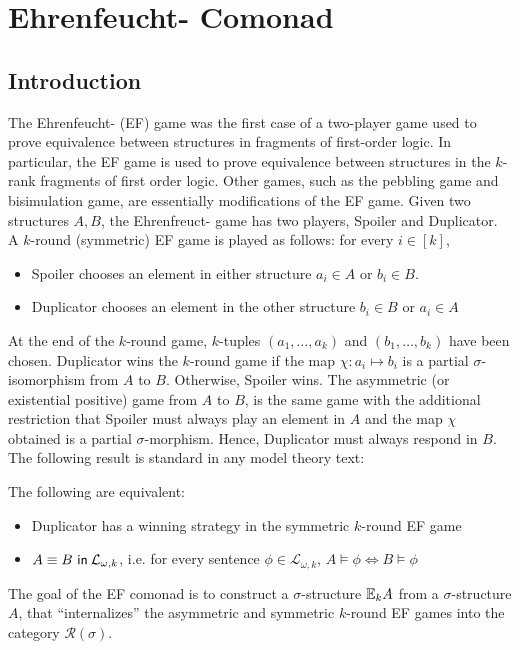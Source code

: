 \chapter{Ehrenfeucht-{\Fraisse} Comonad}
\section{Introduction}
The Ehrenfeucht-{\Fraisse} (EF) game was the first case of a two-player game used to prove equivalence between structures in fragments of first-order logic. In particular, the EF game is used to prove equivalence between structures in the $k$-rank fragments of first order logic. Other games, such as the pebbling game and bisimulation game, are essentially modifications of the EF game. Given two structures $A,B$, the Ehrenfreuct-{\Fraisse} game has two players, Spoiler and Duplicator. A $k$-round (symmetric) EF game is played as follows: for every $i \in [k]$, 
\begin{itemize}
\item Spoiler chooses an element in either structure $a_{i} \in A$ or $b_{i} \in B$. 
\item Duplicator chooses an element in the other structure $b_{i} \in B$ or $a_{i} \in A$  
\end{itemize}
At the end of the $k$-round game, $k$-tuples $(a_{1},\dots,a_{k})$ and $(b_{1},\dots,b_{k})$ have been chosen. Duplicator wins the $k$-round game if the map $\chi:a_{i} \longmapsto b_{i}$ is a partial $\sigma$-isomorphism from $A$ to $B$. Otherwise, Spoiler wins. The asymmetric (or existential positive) game from $A$ to $B$, is the same game with the additional restriction that Spoiler must always play an element in $A$ and the map $\chi$ obtained is a partial $\sigma$-morphism. Hence, Duplicator must always respond in $B$. The following result is standard in any model theory text:
\begin{prop}
The following are equivalent:
\begin{itemize}
\item Duplicator has a winning strategy in the symmetric $k$-round EF game 
\item ${A \equiv B \ \mathsf{in}\: \mathcal{L}_{\omega,k}}$, i.e. for every sentence $\phi \in \mathcal{L}_{\omega,k}$, $A \vDash \phi \Leftrightarrow B \vDash \phi$
\end{itemize}
\end{prop}
The goal of the EF comonad is to construct a $\sigma$-structure ${\mathbb{E}_{k}A}$ from a $\sigma$-structure $A$, that ``internalizes'' the asymmetric and symmetric $k$-round EF games into the category $\mathcal{R}(\sigma)$.  
